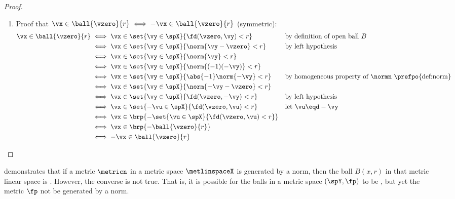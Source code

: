 \begin{proof}
\begin{enumerate}
  \item Proof that $\vx\in \ball{\vzero}{r} \iff -\vx\in \ball{\vzero}{r}$ (symmetric):
        \begin{align*}
          \vx\in \ball{\vzero}{r} 
            &\iff \vx\in\set{\vy\in\spX}{\fd(\vzero,\vy)<r}
            &&    \text{by definition of open ball $B$}
          \\&\iff \vx\in\set{\vy\in\spX}{\norm{\vy-\vzero}<r}
            &&    \text{by left hypothesis}
          \\&\iff \vx\in\set{\vy\in\spX}{\norm{\vy}<r}
          \\&\iff \vx\in\set{\vy\in\spX}{\norm{(-1)(-\vy)}<r}
          \\&\iff \vx\in\set{\vy\in\spX}{\abs{-1}\norm{-\vy}<r}
            &&    \text{by homogeneous property of $\normn$ \prefpo{def:norm}}
          \\&\iff \vx\in\set{\vy\in\spX}{\norm{-\vy-\vzero}<r}
          \\&\iff \vx\in\set{\vy\in\spX}{\fd(\vzero,-\vy)<r}
            &&    \text{by left hypothesis}
          \\&\iff \vx\in\set{-\vu\in\spX}{\fd(\vzero,\vu)<r}
            &&    \text{let $\vu\eqd -\vy$}
          \\&\iff \vx\in \brp{-\set{\vu\in\spX}{\fd(\vzero,\vu)<r}}
          \\&\iff \vx\in \brp{-\ball{\vzero}{r}}
          \\&\iff -\vx\in \ball{\vzero}{r}
        \end{align*}
\end{enumerate}
\end{proof}


 demonstrates that if a metric $\metricn$ in a metric space $\metlinspaceX$
is generated by a norm,
then the ball $B(x,r)$ in that metric linear space is .
However, the converse is not true.
That is, it is possible for the balls in a metric space $(\spY,\fp)$ to be ,
but yet the metric $\fp$ not be generated by a norm.




